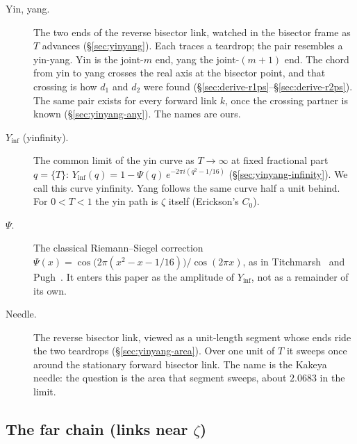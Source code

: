 \documentclass[11pt]{article}
\theoremstyle{definition}
\begin{document}
\begin{description}
\item[Yin, yang.]
The two ends of the reverse bisector link, watched in the
bisector frame as $T$ advances
(\S\ref{sec:yinyang}).
Each traces a teardrop; the pair resembles a yin-yang.
Yin is the joint-$m$ end, yang the joint-$(m+1)$ end.
The chord from yin to yang crosses the real axis at the bisector
point, and that crossing is how $d_1$ and $d_2$ were found
(\S\ref{sec:derive-r1ps}--\S\ref{sec:derive-r2ps}).
The same pair exists for every forward link $k$, once the crossing
partner is known (\S\ref{sec:yinyang-any}).
The names are ours.

\item[$Y_{\inf}$ (yinfinity).]
The common limit of the yin curve as $T\to\infty$ at fixed
fractional part $q=\{T\}$:
$Y_{\inf}(q)=1-\Psi(q)\,e^{-2\pi i(q^{2}-1/16)}$
(\S\ref{sec:yinyang-infinity}).
We call this curve yinfinity.
Yang follows the same curve half a unit behind.
For $0<T<1$ the yin path is $\zeta$ itself (Erickson's $C_0$).

\item[$\Psi$.]
The classical Riemann--Siegel correction
$\Psi(x)=\cos\bigl(2\pi(x^{2}-x-1/16)\bigr)/\cos(2\pi x)$,
as in Titchmarsh~\cite[\S15.3]{Titchmarsh1986} and
Pugh~\cite[\S5.4.1]{Pugh1998}.
It enters this paper as the amplitude of $Y_{\inf}$, not as a
remainder of its own.

\item[Needle.]
The reverse bisector link, viewed as a unit-length segment whose
ends ride the two teardrops
(\S\ref{sec:yinyang-area}).
Over one unit of $T$ it sweeps once around the stationary forward
bisector link.
The name is the Kakeya needle: the question is the area that
segment sweeps, about $2.0683$ in the limit.
\end{description}

\subsection*{The far chain (links near $\zeta$)}
\end{document}
